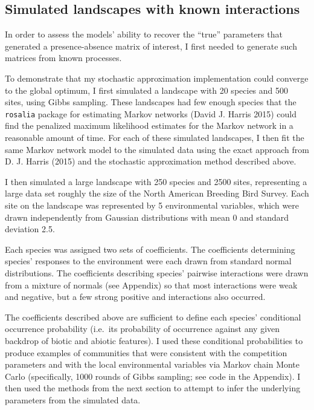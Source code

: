 \subsection{Simulated landscapes with known
interactions}\label{simulated-landscapes-with-known-interactions}

In order to assess the models' ability to recover the ``true''
parameters that generated a presence-absence matrix of interest, I first
needed to generate such matrices from known processes.

To demonstrate that my stochastic approximation implementation could
converge to the global optimum, I first simulated a landscape with 20
species and 500 sites, using Gibbs sampling. These landscapes had few
enough species that the \texttt{rosalia} package for estimating Markov
networks (David J. Harris 2015) could find the penalized maximum
likelihood estimates for the Markov network in a reasonable amount of
time. For each of these simulated landscapes, I then fit the same Markov
network model to the simulated data using the exact approach from D. J.
Harris (2015) and the stochastic approximation method described above.

I then simulated a large landscape with 250 species and 2500 sites,
representing a large data set roughly the size of the North American
Breeding Bird Survey. Each site on the landscape was represented by 5
environmental variables, which were drawn independently from Gaussian
distributions with mean 0 and standard deviation 2.5.

Each species was assigned two sets of coefficients. The coefficients
determining species' responses to the environment were each drawn from
standard normal distributions. The coefficients describing species'
pairwise interactions were drawn from a mixture of normals (see
Appendix) so that most interactions were weak and negative, but a few
strong positive and interactions also occurred.

The coefficients described above are sufficient to define each species'
conditional occurrence probability (i.e.~its probability of occurrence
against any given backdrop of biotic and abiotic features). I used these
conditional probabilities to produce examples of communities that were
consistent with the competition parameters and with the local
environmental variables via Markov chain Monte Carlo (specifically, 1000
rounds of Gibbs sampling; see code in the Appendix). I then used the
methods from the next section to attempt to infer the underlying
parameters from the simulated data.

